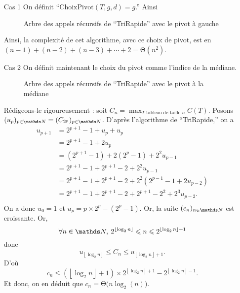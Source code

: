 \begin{itemize}
	\item[{\sc Cas 1}] On définit ``$\mathrm{ChoixPivot}(T, g, d) = g$.''
		Ainsi
		\begin{figure}[H]
			\centering
			\begin{comment}
				0, n-1
				-> 0, -1
				-> 1, n-1
				--> 1, 0
				--> 2, n-1
				---> ...
				-..-> (n-1,n)
			\end{comment}
			\caption{Arbre des appels récursifs de ``TriRapide'' avec le pivot à gauche}
		\end{figure}
		Ainsi, la complexité de cet algorithme, avec ce choix de pivot, est en $(n-1) + (n-2) + (n-3) + \cdots + 2 = \mathrm{\Theta}(n^2)$.
	\item[{\sc Cas 2}] On définit maintenant le choix du pivot comme l'indice de la médiane.
		\begin{figure}[H]
			\centering
			\begin{comment}
				0, 2^p - 1
				-> 0, 2^p - 1
				--> ...
				-> 2^(p-1), 2^p - 1
				--> ...
			\end{comment}
			\caption{Arbre des appels récursifs de ``TriRapide'' avec le pivot à la médiane}
		\end{figure}
		Rédigeons-le rigoureusement : soit $C_n = \max_{T \text{ tableau de taille } n} C(T)$.
		Posons $(u_p)_{p \in \N} = (C_{2^p})_{p \in \N}$. D'après l'algorithme de ``TriRapide,'' on a
		\begin{align*}
			u_{p+1} &= 2^{p+1} - 1 + u_p + u_p\\
			&= 2^{p+1} - 1 + 2u_p \\
			&= (2^{p+1} - 1) + 2(2^p - 1) + 2^2 u_{p-1} \\
			&= 2^{p+1} - 1 + 2^{p+1} - 2 + 2^2 u_{p-1} \\
			&= 2^{p+1} - 1 + 2^{p+1} - 2 + 2^2(2^{p-1} - 1 + 2u_{p-2}) \\
			&= 2^{p+1} - 1 + 2^{p+1} - 2 + 2^{p+1} - 2^2 + 2^3 u_{p-2}. \\
		\end{align*}
		On a donc $u_0 = 1$\/ et $u_p = p \times {2^p} - (2^p - 1)$. Or, la suite $(c_n)_{n\in\N}$\/  est croissante. Or, \[
			\forall n \in \N,\:2^{\left\lfloor \log_2 n \right\rfloor} \le n \le 2^{\left\lfloor \log_2n \right\rfloor + 1}
		\] donc \[
			u_{\left\lfloor \log_2 n \right\rfloor} \le C_n \le u_{\left\lfloor \log_2 n \right\rfloor + 1}
		.\] D'où \[
			c_n \le (\left\lfloor \log_2 n \right\rfloor + 1) \times 2^{\left\lfloor \log_2 n \right\rfloor + 1} - 2^{\left\lfloor \log_2 n \right\rfloor - 1}
		.\] Et donc, on en déduit que $c_n = \mathrm{\Theta}\big(n \log_2(n)\big)$.
\end{itemize}
